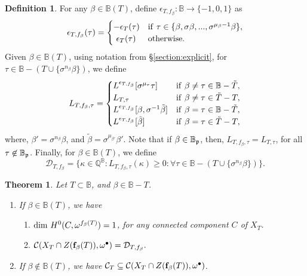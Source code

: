 \documentclass[11pt,pdflatex]{amsart}
\theoremstyle{plain}
\theoremstyle{definition}
\newcommand{\QQ}{\mathbf{Q}}
\theoremstyle{plain}
\newtheorem{thm}[theorem]{Theorem}
\theoremstyle{definition}
\newtheorem{dfn}[theorem]{Definition}
\theoremstyle{remark}
\numberwithin{equation}{section}
\numberwithin{figure}{section} \numberwithin{table}{subsection}
\newcommand{\gerp}{{\frak{p}}}
\newcommand{\calC}{{\mathcal{C}}}
\newcommand{\calD}{{\mathcal{D}}}
\def\BB{\mathbb{B}}
\def\QQ{\mathbb{Q}}
\begin{document}
\begin{dfn} For any $\beta \in \BB(T)$, define $\epsilon_{T,f_\beta}: \BB \rightarrow  \{-1,0,1\}$ as
$$\epsilon_{T,f_\beta}(\tau)=\begin{cases} -\epsilon_T(\tau) & {\rm if}\ \tau \in \{\beta,\sigma\beta,...,\sigma^{\mu_\beta-1}\beta\}, \\ \ \epsilon_T(\tau) &{\rm otherwise.}
 \end{cases}$$ 
 Given $\beta \in \BB(T)$, using notation from \S \ref{section:explicit}, for  $\tau \in \BB-(T\cup \{\sigma^{n_\beta}\beta\})$, we define 
 $$L_{T,f_\beta,\tau}=\begin{cases} L^{\epsilon_{T,f_\beta}}[\sigma^{\mu_\tau}\tau]& {\rm if}\  \beta \neq \tau \in \BB-\tilde{T}, \\  
 L_{T,\tau}& {\rm if}\  \beta \neq \tau \in \tilde{T}-T,\\
 L^{\epsilon_{T,f_\beta}}[\beta,\sigma^{-1}\tilde{\beta}]&{\rm if}\ \beta=\tau \in \BB-\tilde{T}, \\  
 L^{\epsilon_{T,f_\beta}}[\tilde\beta]&{\rm if}\  \beta=\tau \in \tilde{T}-T,
 \end{cases}$$
 where, $\beta'={\sigma^{n_\beta}\beta}$, and $\tilde{\beta}=\sigma^{\mu_{\beta'}}\beta'$. Note that if $\beta \in \BB_\gerp$, then, $L_{T,f_\beta,\tau}=L_{T,\tau}$, for all $\tau \not \in \BB_\gerp$. Finally, for $\beta \in \BB(T)$, we define $$\calD_{T,f_\beta}=\{\kappa \in \QQ^\BB: L_{T,f_\beta,\tau}(\kappa)\geq 0: \forall \tau \in \BB-(T\cup \{\sigma^{n_\beta}\beta\})\}.$$
 
 \end{dfn}
 
 
   \begin{thm} \label{thm: general cones} Let $T \subset \BB$, and $\beta \in \BB-T$. \begin{enumerate}
\item If $\beta \in\BB(T)$, we have 
\begin{enumerate}
\item ${\rm dim}\ H^0(C,\omega^{f_\beta(T)})=1$, for any connected component $C$ of $X_T$.
\item $\calC(X_T \cap Z({\bf f}_\beta(T)),\omega^\bullet)=\calD_{T,f_\beta}.$
\end{enumerate}
\item If $\beta\not\in \BB(T)$, we have $\calC_T  \subseteq \calC(X_T \cap Z({\bf f}_\beta(T)),\omega^\bullet)$.
\end{enumerate}
\end{thm}
\end{document}
